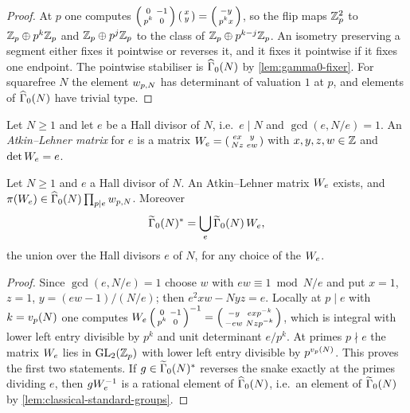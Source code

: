 \begin{proof}
At $p$ one computes $\left(\begin{smallmatrix} 0 & -1 \\ p^{k} & 0 \end{smallmatrix}\right)\left(\begin{smallmatrix} x \\ y \end{smallmatrix}\right) =
\left(\begin{smallmatrix} -y \\ p^{k}x \end{smallmatrix}\right)$, so the flip maps
$\mathbb{Z}_{p}^{2}$ to $\mathbb{Z}_{p}\oplus p^{k}\mathbb{Z}_{p}$
and $\mathbb{Z}_{p}\oplus p^{j}\mathbb{Z}_{p}$ to the class of
$\mathbb{Z}_{p}\oplus p^{k-j}\mathbb{Z}_{p}$. An isometry
preserving a segment either fixes it pointwise or reverses it, and it fixes
it pointwise if it fixes one endpoint. The pointwise stabiliser is
$\GammaZero[ad]{N}$ by \cref{lem:gamma0-fixer}. For squarefree $N$ the
element $w_{p,N}$ has determinant of valuation $1$ at $p$, and elements
of $\GammaZero[ad]{N}$ have trivial type.
\end{proof}

\begin{definition}\label{def:global-al}
Let $N \geq 1$ and let $e$ be a Hall divisor of $N$, i.e.\ $e \mid N$ and
$\gcd(e, N/e) = 1$. An \emph{Atkin--Lehner matrix} for $e$ is a matrix
$W_{e} = \left(\begin{smallmatrix} ex & y \\ Nz & ew \end{smallmatrix}\right)$ with $x,y,z,w \in \mathbb{Z}$ and
$\det W_{e} = e$.
\end{definition}

\begin{lemma}
\label{lem:global-al}
Let $N \geq 1$ and $e$ a Hall divisor of $N$. An Atkin--Lehner matrix
$W_{e}$ exists, and $\AdelicProjection(\ALmatrix{e}) \in
\GammaZero[ad]{N}\prod_{p \mid e}\ALflip{p,N}$. Moreover
\[
  \GammaZeroStar[lift]{N} = \bigcup_{e} \GammaZero[lift]{N}\,\ALmatrix{e},
\]
the union over the Hall divisors $e$ of $N$, for any choice of the
$W_{e}$.
\end{lemma}

\begin{proof}
Since $\gcd(e, N/e) = 1$ choose $w$ with $ew \equiv 1 \bmod N/e$ and put
$x = 1$, $z = 1$, $y = (ew-1)/(N/e)$; then $e^{2}xw - Nyz = e$. Locally at
$p \mid e$ with $k = v_{p}(N)$ one computes
$W_{e}\left(\begin{smallmatrix} 0 & -1 \\ p^{k} & 0 \end{smallmatrix}\right)^{-1} =
\left(\begin{smallmatrix} -y & ex p^{-k} \\ -ew & Nzp^{-k} \end{smallmatrix}\right)$, which is integral with lower left
entry divisible by $p^{k}$ and unit determinant $e/p^{k}$. At primes
$p \nmid e$ the matrix $W_{e}$ lies in $\GL{2}{\pAdicIntegers{p}}$
with lower left entry divisible by $p^{v_{p}(N)}$. This proves the first
two statements. If $g \in \GammaZeroStar[lift]{N}$ reverses the snake
exactly at the primes dividing $e$, then $gW_{e}^{-1}$ is a rational
element of $\GammaZero[ad]{N}$, i.e.\ an element of $\GammaZero[lift]{N}$ by
\cref{lem:classical-standard-groups}.
\end{proof}

